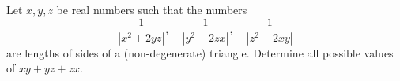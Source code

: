 Let $x,y,z$ be real numbers such that the numbers $$\frac{1}{|x^2+2yz|},\quad\frac{1}{|y^2+2zx|},\quad\frac{1}{|z^2+2xy|}$$are lengths of sides of a (non-degenerate) triangle. Determine all possible values of $xy+yz+zx$.